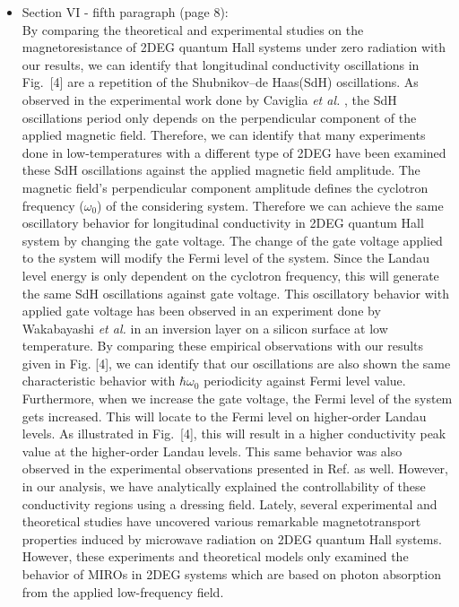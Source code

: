 \documentclass{article}
\begin{document}
\begin{itemize}
{  }
  \item Section VI - fifth paragraph (page 8):\\
  {\color{Maroon}
  By comparing the theoretical \cite{ando72,ando74_1,ando74_2,ando74_3,ando74_4,ando82,endo09} and experimental \cite{endo09,wakabayashi78,ochiai190,mancoff96,arapov02,grbic04,caviglia10} studies on the magnetoresistance of 2DEG quantum Hall systems under zero radiation with our results, we can identify that longitudinal conductivity oscillations in Fig.~[4] are a repetition of the Shubnikov–de Haas(SdH) oscillations.
  As observed in the experimental work done by Caviglia \textit{et al.} \cite{caviglia10}, the SdH oscillations period only depends on the perpendicular component of the applied magnetic field.
  Therefore, we can identify that many experiments done in low-temperatures \cite{endo09,ochiai190,mancoff96,arapov02,grbic04,caviglia10} with a different type of 2DEG have been examined these SdH oscillations against the applied magnetic field amplitude.
  The magnetic field's perpendicular component amplitude defines the cyclotron frequency ($\omega_0$) of the considering system.
  Therefore we can achieve the same oscillatory behavior for longitudinal conductivity in 2DEG quantum Hall system by changing the gate voltage. The  change of the gate voltage applied to the system will modify the Fermi level of the system.
  Since the Landau level energy is only dependent on the cyclotron frequency, this will generate the same SdH oscillations against gate voltage.
  This oscillatory behavior with applied gate voltage has been observed in an  experiment done by Wakabayashi \textit{et al.} \cite{wakabayashi78} in an inversion layer on a silicon surface at low temperature. By comparing these empirical observations with our results given in Fig. [4], we can identify that our oscillations are also shown the same characteristic behavior with $\hbar\omega_0$ periodicity against Fermi level value. Furthermore, when we increase the gate voltage, the Fermi level of the system gets increased. This will locate to the Fermi level on higher-order Landau levels. As illustrated in Fig.~[4], this will result in a higher conductivity peak value at the higher-order Landau levels. This same behavior was also observed in the experimental observations presented in Ref. \cite{wakabayashi78} as well. However, in our analysis, we have analytically explained the controllability of these conductivity regions using a dressing field.
  Lately, several experimental \cite{zudov01,mani02,zudov03,mani04} and theoretical \cite{durst03,dmitriev03,dmitriev05,dmitriev09} studies have uncovered various remarkable magnetotransport properties induced by microwave radiation on 2DEG quantum Hall systems. However, these experiments and theoretical models only examined the behavior of MIROs in 2DEG systems which are based on photon absorption from the applied low-frequency field.
}
\end{itemize}
\end{document}
